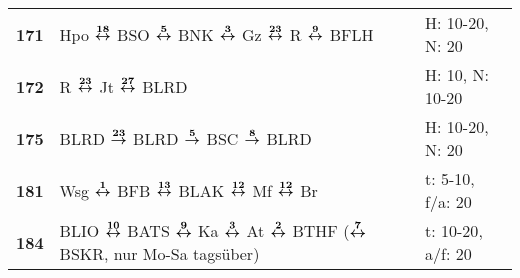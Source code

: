 \begin{minipage}[t]{0.45\textwidth}
\begin{tabular}{>{\bfseries}L{1.2cm}L{9.0cm}L{3.0cm}}
\bus{} 171    & Hpo $\xarwe{18}$ BSO $\xarwe{5}$ BNK $\xarwe{3}$ Gz $\xarwe{23}$ R $\xarwe{9}$ BFLH                                                                  & H: 10-20, N: 20            \\
\bus{} 172    & R $\xarwe{23}$ Jt $\xarwe{27}$ BLRD                                                                                                                                 & H: 10, N: 10-20            \\
\bus{} 175    & BLRD $\xarre{23}$ BLRD $\xarre{5}$ BSC $\xarre{8}$ BLRD                                                                                                             & H: 10-20, N: 20            \\
\bus{} 181    & Wsg $\xarwe{1}$ BFB $\xarwe{13}$ BLAK $\xarwe{12}$ Mf $\xarwe{12}$ Br                                                                                               & t: 5-10, f/a: 20           \\
\bus{} 184    & BLIO $\xarwe{10}$ BATS $\xarwe{9}$ Ka $\xarwe{3}$ At $\xarwe{2}$ BTHF ($\xarwe{7}$ BSKR, nur Mo-Sa tagsüber)
& t: 10-20, a/f: 20          \\
\hline
\end{tabular}
\end{minipage}
\begin{minipage}[t]{0.05\textwidth}
\phantom{Tor}
\end{minipage}

